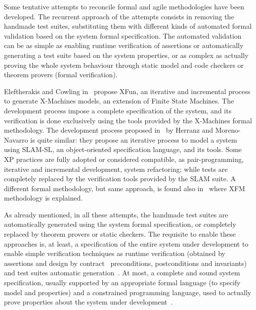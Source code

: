 \documentclass{article}
\begin{document}
Some tentative attempts to reconcile formal and agile methodologies have been developed.
The recurrent approach of the attempts consists in removing the handmade test suites, substituting them with different kinds of automated formal validation based on the system formal specification. 
The automated validation can be as simple as enabling runtime verification of assertions or automatically generating a test suite based on the system properties, or as complex as actually proving the whole system behaviour through static model and code checkers or theorem provers (formal verification).

Eleftherakis and Cowling in~\cite{Eleftherakis2003} propose XFun, an iterative and incremental process to generate X-Machines models, an extension of Finite State Machines. 
The development process impose a complete specification of the system, and its verification is done exclusively using the tools provided by the X-Machines formal methodology. 
The development process proposed in~\cite{Herranz2003b} by Herranz and Moreno-Navarro is quite similar: they propose an iterative process to model a system using SLAM-SL, an object-oriented specification language, and its tools. 
Some XP practices are fully adopted or considered compatible, as pair-programming, iterative and incremental development, system refactoring; while tests are completely replaced by the verification tools provided by the SLAM suite.
A different formal methodology, but same approach, is found also in~\cite{Suhaib2005} where XFM methodology is explained.

As already mentioned, in all these attempts, the handmade test suites are automatically generated using the system formal specification, or completely replaced by theorem provers or static checkers. 
The requisite to enable these approaches is, at least, a specification of the entire system under development to enable simple verification techniques as runtime verification (obtained by assertions and design by contract~\cite{Meyer1997} preconditions, postconditions and invariants) and test suites automatic generation~\cite{Cheon2002,Cheon2004,Cheon2005}.
At most, a complete and sound system specification, usually supported by an appropriate formal language (to specify model and properties) and a constrained programming language, used to actually prove properties about the system under development~\cite{CatanoHuisman02,DetlefsNelsonSaxe2005,KiniryCok04}.
\end{document}

